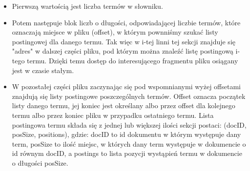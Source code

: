 \documentclass[11pt,leqno]{article}
\begin{document}
\begin{itemize}
\item Pierwszą wartością jest liczba termów w słowniku.
\item Potem następuje blok liczb o długości, odpowiadającej liczbie termów, które oznaczają miejsce w pliku (offset), w którym pownniśmy szukać listy postingowej dla danego termu. Tak więc w i-tej linni tej sekcji znajduje się "adres" w dalszej części pliku, pod którym można znaleźć listę postingową i-tego termu. Dzięki temu dostęp do interesującego fragmentu pliku osiągany jest w czasie stałym.
\item W pozostałej części pliku zaczynając się pod wspomnianymi wyżej offsetami znajdują się listy postingowe poszczególnych termów. Offset oznacza początek listy danego termu, jej koniec jest określany albo przez offset dla kolejnego termu albo przez koniec pliku w przypadku ostatniego termu. Lista postingowa termu składa się z jednej lub większej ilości sekcji postaci: (docID, posSize, positions), gdzie: docID to id dokumentu w którym występuje dany term, posSize to ilość miejsc, w których dany term występuje w dokumencie o id równym docID, a postings to lista pozycji wystąpień termu w dokumencie o długości posSize. 
\end{itemize} 
\end{document}
